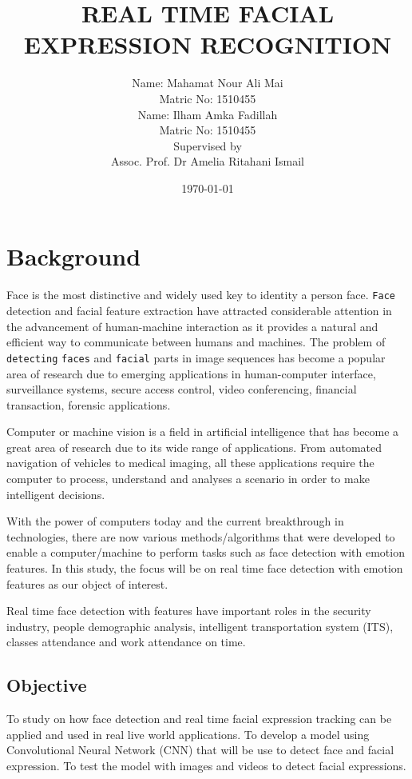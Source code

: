 \documentclass[12pt]{report}
\title{\bf REAL TIME FACIAL EXPRESSION RECOGNITION }
\author{ Name: Mahamat Nour Ali Mai\\
	Matric No: 1510455 \\ 
	[1cm]
	Name: Ilham Amka Fadillah \\
	Matric No: 1510455\\
	[1cm]
	Supervised by\\
	[1.5cm]
	Assoc. Prof. Dr Amelia Ritahani Ismail\\}
\date{\today}
\begin{document}
                        
\maketitle                              
{}                   
\setcounter{page}{2}                    
\tableofcontents                        

\chapter{Background}               
Face is the most distinctive and widely used key to
identity a person face. \texttt{Face} detection and facial feature extraction have attracted considerable attention in the advancement of human-machine interaction as it provides a natural and efficient way to communicate between humans and machines. The problem of \texttt{detecting} \texttt{faces} and \texttt{facial} parts in image sequences has become a popular area of research due to emerging applications in human-computer interface, surveillance systems, secure access control, video conferencing, financial transaction, forensic applications.

Computer or machine vision is a field in artificial intelligence that has become a great area of research due to its wide range of applications. From automated navigation of vehicles to medical imaging, all these applications require the computer to process, understand and analyses a scenario in order to make intelligent decisions.

With the power of computers today and the current breakthrough in technologies,
there are now various methods/algorithms that were developed to enable a
computer/machine to perform tasks such as face detection with emotion features. In this study, the focus will be on real time face detection with emotion features as our object of interest. 

Real time face detection with features have important roles in the security industry,
people demographic analysis, intelligent transportation system (ITS), classes attendance and work attendance on time.

\section{Objective}                 
To study on how face detection and real time facial expression tracking can be applied and used in real live world applications. To develop a model using Convolutional Neural Network (CNN) that will be use to detect face and facial expression. To test the model with images and videos to detect facial expressions. 
\end{document}
